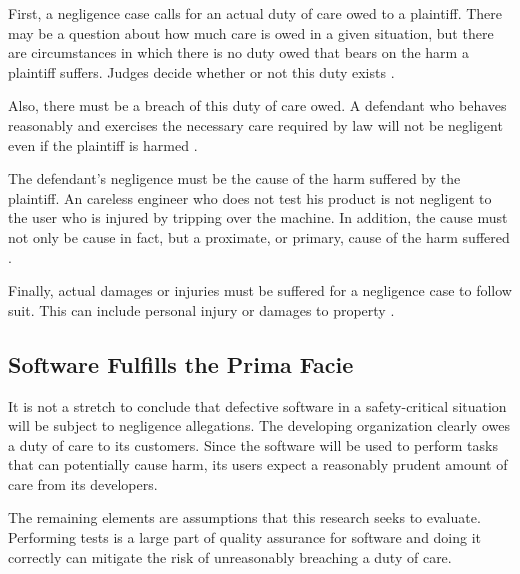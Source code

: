 First, a negligence case calls for an actual duty of care owed to a plaintiff.
There may be a question about how much care is owed in a given situation, but
there are circumstances in which there is no duty owed that bears on the harm a
plaintiff suffers. Judges decide whether or not this duty exists \cite{Dobbs01}.

Also, there must be a breach of this duty of care owed. A defendant who behaves
reasonably and exercises the necessary care required by law will not be
negligent even if the plaintiff is harmed \cite{Dobbs01}.

The defendant's negligence must be the cause of the harm suffered by the
plaintiff. An careless engineer who does not test his product is not negligent
to the user who is injured by tripping over the machine. In addition, the cause
must not only be cause in fact, but a proximate, or primary, cause of the harm
suffered \cite{Dobbs01}.

Finally, actual damages or injuries must be suffered for a negligence case to
follow suit. This can include personal injury or damages to property
\cite{Dobbs01}.

\subsection{Software Fulfills the Prima Facie}

It is not a stretch to conclude that defective software in a safety-critical
situation will be subject to negligence allegations. The developing
organization clearly owes a duty of care to its customers. Since the software
will be used to perform tasks that can potentially cause harm, its users expect
a reasonably prudent amount of care from its developers.

The remaining elements are assumptions that this research seeks to evaluate.
Performing tests is a large part of quality assurance for software and doing it
correctly can mitigate the risk of unreasonably breaching a duty of care.

